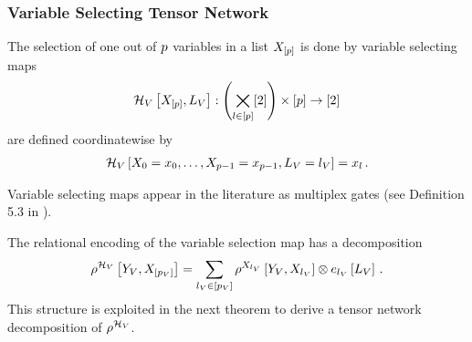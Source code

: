 \subsubsection{Variable Selecting Tensor Network}


\begin{definition}\label{def:variableSelector}
	The selection of one out of $p$ variables in a list $X_{[p]}$ is done by variable selecting maps
	\begin{align}
		\mathcal{H}_{V}\left[X_{[p]},L_{V}\right]:  \left(\bigtimes_{l\in[p]}[2]\right) \times [p]  \rightarrow [2]
	\end{align}
	are defined coordinatewise by
	\begin{align}
		\mathcal{H}_{V}\left[X_{0}=x_{0},\ldots,X_{p-1}=x_{p-1},L_{V}=l_{V}\right] = x_{l} \, .
	\end{align}
\end{definition}
	
Variable selecting maps appear in the literature as multiplex gates (see Definition 5.3 in \cite{koller_probabilistic_2009}).

The relational encoding of the variable selection map has a decomposition 
\begin{align*}
	\rho^{\mathcal{H}_{V}}\left[Y_{V},X_{[p_{V}]}\right]
	= \sum_{l_{V}\in[p_{V}]} 
	\rho^{X_{l_{V}}}\left[Y_{V},X_{l_{V}}\right] \otimes  e_{l_{V}}\left[L_{V}\right] \, . 
\end{align*}
This structure is exploited in the next theorem to derive a tensor network decomposition of $\rho^{\mathcal{H}_{V}}$.

